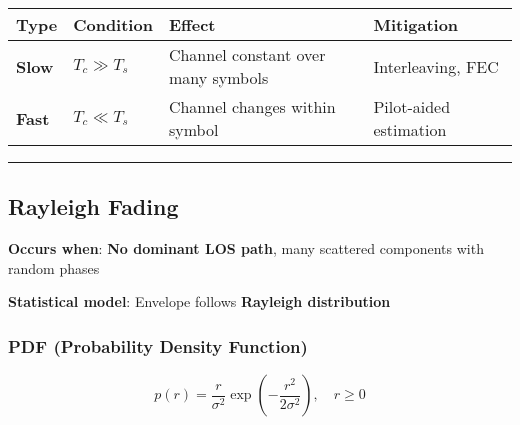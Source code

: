 {\def\LTcaptype{} %
\begin{longtable}[]{@{}
  >{\raggedright\arraybackslash}p{}
  >{\raggedright\arraybackslash}p{}
  >{\raggedright\arraybackslash}p{}
  >{\raggedright\arraybackslash}p{}@{}}
\toprule\noalign{}
\begin{minipage}[b]{\linewidth}\raggedright
Type
\end{minipage} & \begin{minipage}[b]{\linewidth}\raggedright
Condition
\end{minipage} & \begin{minipage}[b]{\linewidth}\raggedright
Effect
\end{minipage} & \begin{minipage}[b]{\linewidth}\raggedright
Mitigation
\end{minipage} \\
\midrule\noalign{}
\endhead
\bottomrule\noalign{}
\endlastfoot
\textbf{Slow} & \(T_c \gg T_s\) & Channel constant over many symbols &
Interleaving, FEC \\
\textbf{Fast} & \(T_c \ll T_s\) & Channel changes within symbol &
Pilot-aided estimation \\
\end{longtable}
}

\begin{center}\rule{0.5\linewidth}{0.5pt}\end{center}

\subsection{Rayleigh Fading}\label{rayleigh-fading}

\textbf{Occurs when}: \textbf{No dominant LOS path}, many scattered
components with random phases

\textbf{Statistical model}: Envelope follows \textbf{Rayleigh
distribution}

\subsubsection{PDF (Probability Density
Function)}\label{pdf-probability-density-function}

\[
p(r) = \frac{r}{\sigma^2} \exp\left(-\frac{r^2}{2\sigma^2}\right), \quad r \geq 0
\]

